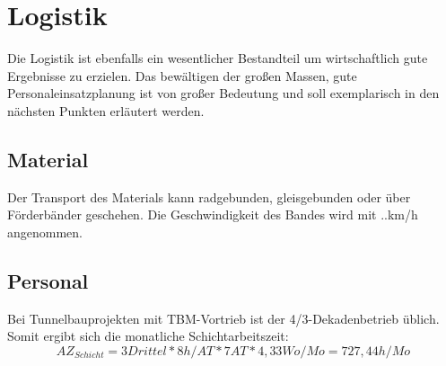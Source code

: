 \chapter{Logistik}
Die Logistik ist ebenfalls ein wesentlicher Bestandteil um wirtschaftlich gute Ergebnisse zu erzielen. Das bewältigen der großen Massen, gute Personaleinsatzplanung ist von großer Bedeutung und soll exemplarisch in den nächsten Punkten erläutert werden.
\section{Material}
Der Transport des Materials kann radgebunden, gleisgebunden oder über Förderbänder geschehen.
Die Geschwindigkeit des Bandes wird mit ..km/h angenommen.
\section{Personal}
Bei Tunnelbauprojekten mit TBM-Vortrieb ist der 4/3-Dekadenbetrieb üblich.
Somit ergibt sich die monatliche Schichtarbeitszeit:
\begin{equation}
AZ_{Schicht}=3 Drittel*8 h/AT*7 AT*4,33Wo/Mo=727,44 h/Mo
\end{equation}

